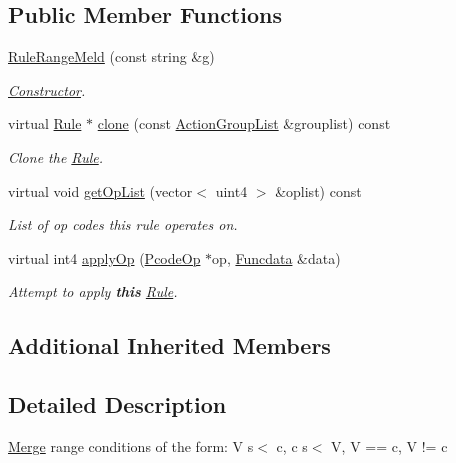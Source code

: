 \subsection*{Public Member Functions}
\begin{DoxyCompactItemize}
\item 
\mbox{\hyperlink{class_rule_range_meld_ac9e65abb14b028184a0c917db181314d}{Rule\+Range\+Meld}} (const string \&g)
\begin{DoxyCompactList}\small\item\em \mbox{\hyperlink{class_constructor}{Constructor}}. \end{DoxyCompactList}\item 
virtual \mbox{\hyperlink{class_rule}{Rule}} $\ast$ \mbox{\hyperlink{class_rule_range_meld_a3d44e55b0b5ac831e649bb220ffa8342}{clone}} (const \mbox{\hyperlink{class_action_group_list}{Action\+Group\+List}} \&grouplist) const
\begin{DoxyCompactList}\small\item\em Clone the \mbox{\hyperlink{class_rule}{Rule}}. \end{DoxyCompactList}\item 
virtual void \mbox{\hyperlink{class_rule_range_meld_a2ab026b0fd6678141add434965eb1353}{get\+Op\+List}} (vector$<$ uint4 $>$ \&oplist) const
\begin{DoxyCompactList}\small\item\em List of op codes this rule operates on. \end{DoxyCompactList}\item 
virtual int4 \mbox{\hyperlink{class_rule_range_meld_af99e831a0fd88d12ef57c0cd9fe01c1d}{apply\+Op}} (\mbox{\hyperlink{class_pcode_op}{Pcode\+Op}} $\ast$op, \mbox{\hyperlink{class_funcdata}{Funcdata}} \&data)
\begin{DoxyCompactList}\small\item\em Attempt to apply {\bfseries{this}} \mbox{\hyperlink{class_rule}{Rule}}. \end{DoxyCompactList}\end{DoxyCompactItemize}
\subsection*{Additional Inherited Members}


\subsection{Detailed Description}
\mbox{\hyperlink{class_merge}{Merge}} range conditions of the form\+: {\ttfamily V s$<$ c, c s$<$ V, V == c, V != c} 

